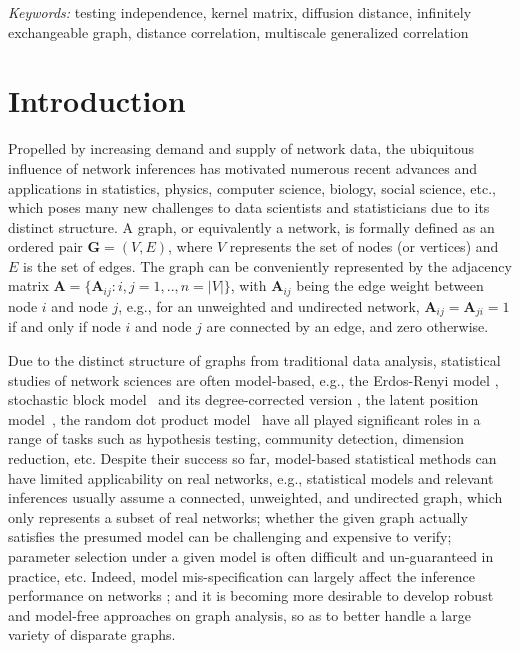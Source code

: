 \documentclass[11pt]{article}
\theoremstyle{definition}
\begin{document}
\noindent%
{\it Keywords:} testing independence, kernel matrix, diffusion distance, infinitely exchangeable graph, distance correlation, multiscale generalized correlation

\sloppy
\doublespacing

\section{Introduction}
\label{sec:intro}

Propelled by increasing demand and supply of network data, the ubiquitous influence of network inferences has motivated numerous recent advances and applications in statistics, physics, computer science, biology, social science, etc., which poses many new challenges to data scientists and statisticians due to its distinct structure. A graph, or equivalently a network, is formally defined as an ordered pair $\mathbf{G}=(V,E)$, where $V$ represents the set of nodes (or vertices) and $E$ is the set of edges. The graph can be conveniently represented by the adjacency matrix $\mathbf{A} = \{\mathbf{A}_{ij} : i,j= 1,..,n = |V| \}$, with $\mathbf{A}_{ij}$ being the edge weight between node $i$ and node $j$, e.g., for an unweighted and undirected network, $\mathbf{A}_{ij} =\mathbf{A}_{ji} = 1$ if and only if node $i$ and node $j$ are connected by an edge, and zero otherwise.

Due to the distinct structure of graphs from traditional data analysis, statistical studies of network sciences are often model-based, e.g., the Erdos-Renyi model \cite{erdosrenyi1959,Gilbert1959}, stochastic block model~\cite{HollandEtAl1983, rohe2011spectral,SussmanEtAl2012,Lei2015} and its degree-corrected version \cite{karrer2011stochastic, ZhaoLevinaZhu2012}, the latent position model~\cite{TangSussmanPriebe2013,fosdick2015testing}, the random dot product model~\cite{YoungScheinerman2007, sussman2014consistent} have all played significant roles in a range of tasks such as hypothesis testing, community detection, dimension reduction, etc. Despite their success so far, model-based statistical methods can have limited applicability on real networks, e.g., statistical models and relevant inferences usually assume a connected, unweighted, and undirected graph, which only represents a subset of real networks; whether the given graph actually satisfies the presumed model can be challenging and expensive to verify; parameter selection under a given model is often difficult and un-guaranteed in practice, etc. Indeed, model mis-specification can largely affect the inference performance on networks \cite{ChenShenVogelsteinPriebe2016}; and it is becoming more desirable to develop robust and model-free approaches on graph analysis, so as to better handle a large variety of disparate graphs. 
\end{document}
